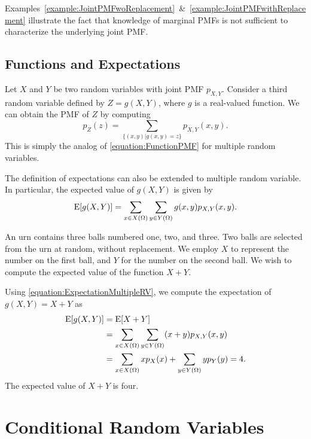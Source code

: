 Examples~\ref{example:JointPMFwoReplacement}~\&~\ref{example:JointPMFwithReplacement} illustrate the fact that knowledge of marginal PMFs is not sufficient to characterize the underlying joint PMF.


\subsection{Functions and Expectations}

Let $X$ and $Y$ be two random variables with joint PMF $p_{X,Y}$.
Consider a third random variable defined by $Z = g(X,Y)$, where $g$ is a real-valued function.
We can obtain the PMF of $Z$ by computing
\begin{equation*}
p_Z (z)
= \sum_{\{ (x,y) | g(x,y) = z \}} p_{X,Y} (x, y).
\end{equation*}
This is simply the analog of \eqref{equation:FunctionPMF} for multiple random variables.

The definition of expectations can also be extended to multiple random variable.
In particular, the expected value of $g(X,Y)$ is given by
\begin{equation} \label{equation:ExpectationMultipleRV}
\mathrm{E} [g(X,Y)] = \sum_{x \in X(\Omega)} \sum_{y \in Y(\Omega)} g(x,y) p_{X,Y} (x,y) .
\end{equation}

\begin{example}
An urn contains three balls numbered one, two, and three.
Two balls are selected from the urn at random, without replacement.
We employ $X$ to represent the number on the first ball, and $Y$ for the number on the second ball.
We wish to compute the expected value of the function $X + Y$.

Using \eqref{equation:ExpectationMultipleRV}, we compute the expectation of $g(X,Y) = X + Y$ as
\begin{equation*}
\begin{split}
\mathrm{E} [g(X,Y)] &= \mathrm{E} [X + Y] \\
&= \sum_{x \in X(\Omega)} \sum_{y \in Y(\Omega)} (x + y) p_{X,Y} (x,y) \\
&= \sum_{x \in X(\Omega)} x p_X (x) + \sum_{y \in Y(\Omega)} y p_Y (y)
= 4.
\end{split}
\end{equation*}
The expected value of $X + Y$ is four.
\end{example}


\section{Conditional Random Variables}

